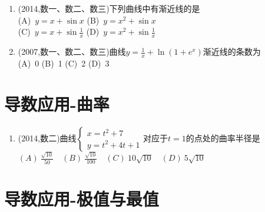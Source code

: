 \documentclass[12pt, a4paper, oneside, UTF8]{ctexbook}
\begin{document}
\begin{enumerate}[label=\arabic*.,start=13]
    \item  (2014,数一、数二、数三)下列曲线中有渐近线的是 \\
        (A)\ $y=x+\sin x$ \qquad (B)\ $y=x^2+\sin x$ \\
        (C)\ $y=x+\sin\frac{1}{x}$ \qquad (D)\ $y=x^2+\sin\frac{1}{x}$
    
    \begin{solution}
    \newpage
    \end{solution}
    
    \item  (2007,数一、数二、数三)曲线$y=\frac{1}{x}+\ln(1+e^x)$渐近线的条数为 \\
        (A)\ 0 \qquad (B)\ 1 \qquad (C)\ 2 \qquad (D)\ 3
    
    \begin{solution}
    \newpage
    \end{solution}
\end{enumerate}

\section{导数应用-曲率}

\begin{enumerate}[label=\arabic*.,start=15]
    \item  (2014,数二)曲线$\begin{cases}
        x=t^2+7 \\
        y=t^2+4t+1
    \end{cases}$对应于$t=1$的点处的曲率半径是 \\
        $(A)\ \frac{\sqrt{10}}{50} \quad (B)\ 
        \frac{\sqrt{10}}{100} \quad (C)\ 10\sqrt{10} \quad (D)\ 5\sqrt{10}$
    
    \begin{solution}
    \newpage
    \end{solution}
\end{enumerate}

\section{导数应用-极值与最值}
\end{document}
